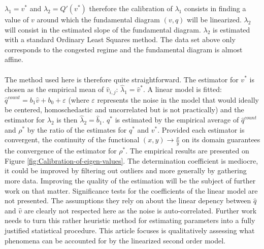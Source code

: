 \documentclass[preprint]{elsarticle}
\begin{document}
$\lambda_{1}=v^{*}$ and $\lambda_{2}=Q'\left(v^{*}\right)$ therefore
the calibration of $\lambda_{1}$ consists in finding a value of $v$
around which the fundamental diagram $\left(v,q\right)$ will be linearized.
$\lambda_{2}$ will consist in the estimated slope of the fundamental
diagram. $\lambda_{2}$ is estimated with a standard Ordinary Least
Squares method. The data set above only corresponds to the congested
regime and the fundamental diagram is almost affine.\\
\\
The method used here is therefore quite straightforward. The estimator
for $v^{*}$ is chosen as the empirical mean of $\widehat{v}_{i,j}$:
$\widehat{\lambda}_{1}=\widehat{v}^{*}$. A linear model is fitted:
$\widehat{q}^{count}=b_{1}\widehat{v}+b_{0}+\varepsilon$ (where $\varepsilon$
represents the noise in the model that would ideally be centered,
homoschedastic and uncorrelated but is not practically) and the estimator
for $\lambda_{2}$ is then $\widehat{\lambda}_{2}=\widehat{b}_{1}$.
$q^{*}$ is estimated by the empirical average of $\widehat{q}^{count}$
and $\rho^{*}$ by the ratio of the estimates for $q^{*}$ and $v^{*}$.
Provided each estimator is convergent, the continuity of the functional
$\left(x,y\right)\rightarrow\frac{x}{y}$ on its domain guarantees
the convergence of the estimator for $\rho^{*}$. The empirical results are presented on Figure \ref{fig:Calibration-of-eigen-values}.
The determination coefficient is mediocre, it could be improved
by filtering out outliers and more generally by gathering more data.
Improving the quality of the estimation will be the subject of further
work on that matter. Significance tests for the coefficients of the
linear model are not presented. The assumptions they rely on about
the linear depency between $\widehat{q}$ and $\widehat{v}$ are clearly
not respected here as the noise is auto-correlated. Further
work needs to turn this rather heuristic method for estimating parameters
into a fully justified statistical procedure. This article focuses
is qualitatively assessing what phenomena can be accounted for by
the linearized second order model.
\end{document}
